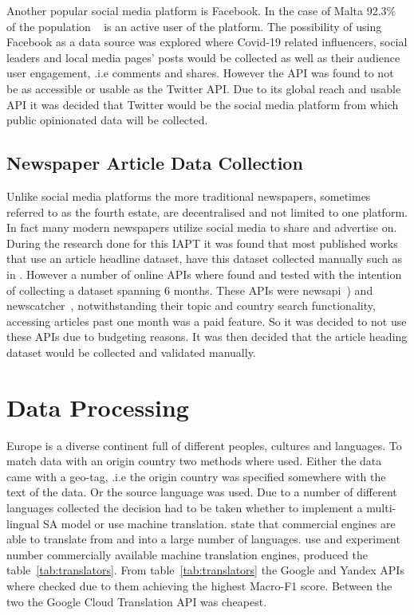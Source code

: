 Another popular social media platform is Facebook.
In the case of Malta 92.3\% of the population ~\citep{napoleoncat} is an active user of the platform.
The possibility of using Facebook as a data source was explored where Covid-19 related influencers, social leaders and local media pages' posts would be collected as well as their audience user engagement, .i.e comments and shares.
However the \ac{API} was found to not be as accessible or usable as the Twitter \ac{API}.
Due to its global reach and usable \ac{API} it was decided that Twitter would be the social media platform from which public opinionated data will be collected.

\subsection{Newspaper Article Data Collection}

Unlike social media platforms the more traditional newspapers, sometimes referred to as the fourth estate, are decentralised and not limited to one platform.
In fact many modern newspapers utilize social media to share and advertise on.
During the research done for this \ac{IAPT} it was found that most published works that use an article headline dataset, have this dataset collected manually such as in \citet{newspaper_headlines}.
However a number of online \ac{API}s where found and tested with the intention of collecting a dataset spanning 6 months.
These \ac{API}s were newsapi~\citep{newsapi}) and newscatcher~\citep{newscatcher}, notwithstanding their topic and country search functionality, accessing articles past one month was a paid feature.
So it was decided to not use these \ac{API}s due to budgeting reasons.
It was then decided that the article heading dataset would be collected and validated manually.


\section{Data Processing}

Europe is a diverse continent full of different peoples, cultures and languages.
To match data with an origin country two methods where used.
Either the data came with a geo-tag, .i.e the origin country was specified somewhere with the text of the data.
Or the source language was used.
Due to a number of different languages collected the decision had to be taken whether to implement a multi-lingual \ac{SA} model or use machine translation.
\citet{Balahur2014} state that commercial engines are able to translate from and into a large number of languages.
\citet{Arajo2020} use and experiment number commercially available machine translation engines, produced the table~\ref{tab:translators}.
From table~\ref{tab:translators} the Google and Yandex \ac{API}s where checked due to them achieving the highest Macro-F1 score.
Between the two the Google Cloud Translation \ac{API} was cheapest.

